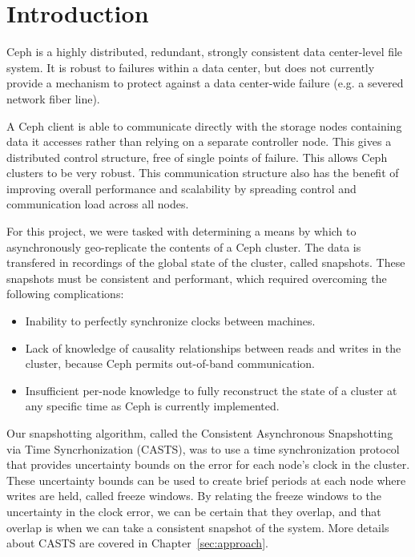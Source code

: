\chapter{Introduction}
\label{sec:introduction}

Ceph is a highly distributed, redundant, strongly consistent data
center-level file system. It is robust to failures within a data
center, but does not currently provide a mechanism to protect against
a data center-wide failure (e.g. a severed network fiber line).

A Ceph client is able to communicate directly with the storage nodes
containing data it accesses rather than relying on a separate
controller node. This gives a distributed control structure, free of
single points of failure. This allows Ceph clusters to be very
robust. This communication structure also has the benefit of improving
overall performance and scalability by spreading control and
communication load across all nodes.

For this project, we were tasked with determining a means by which to
asynchronously geo-replicate the contents of a Ceph cluster. The data is 
transfered in recordings of the global state of the cluster, called snapshots.
These snapshots must be consistent and performant, which required overcoming 
the following complications:

\begin{itemize}
\item Inability to perfectly synchronize clocks between machines.
\item Lack of knowledge of causality relationships between reads and
  writes in the cluster, because Ceph permits out-of-band
  communication.
\item Insufficient per-node knowledge to fully reconstruct the state
  of a cluster at any specific time as Ceph is currently implemented.
\end{itemize}

Our snapshotting algorithm, called the Consistent Asynchronous Snapshotting via Time Syncrhonization (CASTS), was to use a time synchronization protocol that provides
uncertainty bounds on the error for each node's clock in the cluster. These
uncertainty bounds can be used to create brief periods at each node where writes are 
held, called freeze windows. By relating the freeze windows to the uncertainty 
in the clock error, we can be certain that they overlap, and that overlap
is when we can take a consistent snapshot of the system. More details
about CASTS are covered in Chapter~\ref{sec:approach}.

